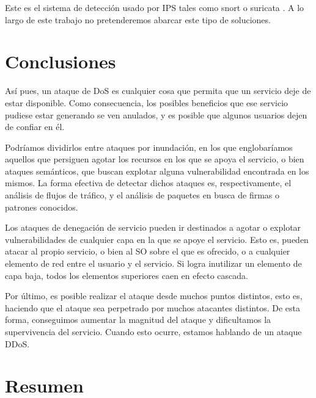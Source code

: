Este es el sistema de detección usado por IPS tales como snort \cite{snort} o suricata \cite{suricata}. A lo largo de 
este trabajo no pretenderemos abarcar este tipo de soluciones.

\section{Conclusiones}
Así pues, un ataque de \gls{DoS} es cualquier cosa que permita que un servicio deje de estar disponible. 
Como consecuencia, los posibles beneficios que ese servicio pudiese estar generando se ven anulados, y es posible que 
algunos usuarios dejen de confiar en él.

Podríamos dividirlos entre ataques por inundación, en los que englobaríamos aquellos que persiguen agotar los recursos 
en los que se apoya el servicio, o bien ataques semánticos, que buscan explotar alguna vulnerabilidad encontrada en los 
mismos. La forma efectiva de detectar dichos ataques es, respectivamente, el análisis de flujos de tráfico, y el 
análisis de paquetes en busca de firmas o patrones conocidos.

Los ataques de denegación de servicio pueden ir destinados a agotar o explotar vulnerabilidades de cualquier capa en la 
que se apoye el servicio. Esto es, pueden atacar al propio servicio, o bien al \gls{SO} sobre el que es ofrecido, o a 
cualquier elemento de red entre el usuario y el servicio. Si logra inutilizar un elemento de capa baja, todos los 
elementos superiores caen en efecto cascada.

Por último, es posible realizar el ataque desde muchos puntos distintos, esto es, haciendo que el ataque sea 
perpetrado por muchos atacantes distintos. De esta forma, conseguimos aumentar la magnitud del ataque y dificultamos 
la supervivencia del servicio. Cuando esto ocurre, estamos hablando de un ataque \gls{DDoS}.


\section{Resumen}%

